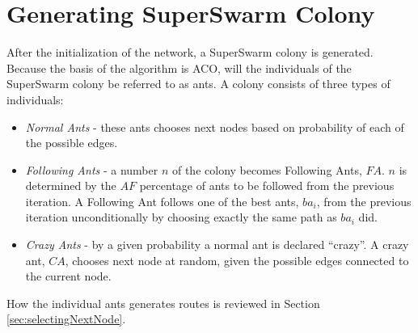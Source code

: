 \section{Generating SuperSwarm Colony}
\label{sec:algoGeneratingSuperSwarm}
After the initialization of the network, a SuperSwarm colony is generated. Because the basis of the algorithm is ACO, will the individuals of the SuperSwarm colony be referred to as ants. A colony consists of three types of individuals:
\begin{itemize}
\item \textit{Normal Ants} - these ants chooses next nodes based on probability of each of the possible edges. 
\item \textit{Following Ants} - a number $n$ of the colony becomes Following Ants, $FA$. $n$ is determined by the $AF$ percentage of ants to be followed from the previous iteration. A Following Ant follows one of the best ants, $ba_i$, from the previous iteration unconditionally by choosing exactly the same path as $ba_i$ did.
\item \textit{Crazy Ants} - by a given probability a normal ant is declared ``crazy''. A crazy ant, $CA$, chooses next node at random, given the possible edges connected to the current node.  
\end{itemize}

How the individual ants generates routes is reviewed in Section \vref{sec:selectingNextNode}.
